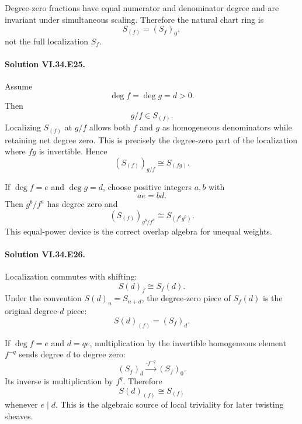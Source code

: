 Degree-zero fractions have equal numerator and denominator degree and are invariant under simultaneous scaling.
Therefore the natural chart ring is
\[
\boxed{S_{(f)}=(S_f)_0},
\]
not the full localization \(S_f\).

\paragraph{Solution VI.34.E25.}
Assume
\[
\deg f=\deg g=d>0.
\]
Then
\[
g/f\in S_{(f)}.
\]
Localizing \(S_{(f)}\) at \(g/f\) allows both \(f\) and \(g\) as homogeneous denominators while retaining net
degree zero. This is precisely the degree-zero part of the localization where \(fg\) is invertible. Hence
\[
\boxed{(S_{(f)})_{g/f}\cong S_{(fg)}}.
\]

If \(\deg f=e\) and \(\deg g=d\), choose positive integers \(a,b\) with
\[
ae=bd.
\]
Then \(g^b/f^a\) has degree zero and
\[
\boxed{
(S_{(f)})_{g^b/f^a}\cong S_{(f^ag^b)}.
}
\]
This equal-power device is the correct overlap algebra for unequal weights.

\paragraph{Solution VI.34.E26.}
Localization commutes with shifting:
\[
S(d)_f\cong S_f(d).
\]
Under the convention \(S(d)_n=S_{n+d}\), the degree-zero piece of \(S_f(d)\) is the original degree-\(d\) piece:
\[
\boxed{S(d)_{(f)}=(S_f)_d}.
\]

If \(\deg f=e\) and \(d=qe\), multiplication by the invertible homogeneous element \(f^{-q}\) sends degree \(d\)
to degree zero:
\[
(S_f)_d\xrightarrow{\cdot f^{-q}}(S_f)_0.
\]
Its inverse is multiplication by \(f^q\). Therefore
\[
\boxed{S(d)_{(f)}\cong S_{(f)}}
\]
whenever \(e\mid d\). This is the algebraic source of local triviality for later twisting sheaves.
